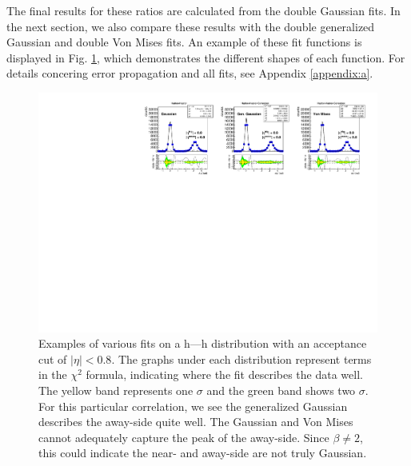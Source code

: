 \documentclass[../main.tex]{subfiles}
\begin{document}
\FloatBarrier
The final results for these ratios are calculated from the double Gaussian fits. In the next section, we also compare these results with the double generalized Gaussian and double Von Mises fits. An example of these fit functions is displayed in Fig. \ref{fig:fit_examples}, which demonstrates the different shapes of each function. For details concering error propagation and all fits, see Appendix \ref{appendix:a}.

\begin{figure}
    \centering
    \includegraphics[scale=0.85]{results/figs/example_fits.pdf}
    \caption{Examples of various fits on a h---h distribution with an acceptance cut of $|\eta|<0.8$. The graphs under each distribution represent terms in the $\chi^2$ formula, indicating where the fit describes the data well. The yellow band represents one $\sigma$ and the green band shows two $\sigma$. For this particular correlation, we see the generalized Gaussian describes the away-side quite well. The Gaussian and Von Mises cannot adequately capture the peak of the away-side. Since $\beta \neq 2$, this could indicate the near- and away-side are not truly Gaussian.}
    \label{fig:fit_examples}
\end{figure}
\FloatBarrier

\ifSubfilesClassLoaded{%
    \printbibliography
}
\end{document}
